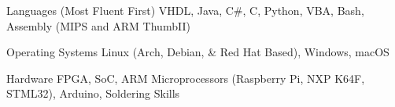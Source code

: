 \begin{cvskills}
	\cvskill
	{Languages (Most Fluent First)}
	{VHDL, Java, C\#, C, Python, VBA, Bash, Assembly (MIPS and ARM ThumbII)}

	\cvskill
	{Operating Systems}
	{Linux (Arch, Debian, \& Red Hat Based), Windows, macOS}

	\cvskill
	{Hardware}
	{FPGA, SoC, ARM Microprocessors (Raspberry Pi, NXP K64F, STML32), Arduino, Soldering Skills}
\end{cvskills}
